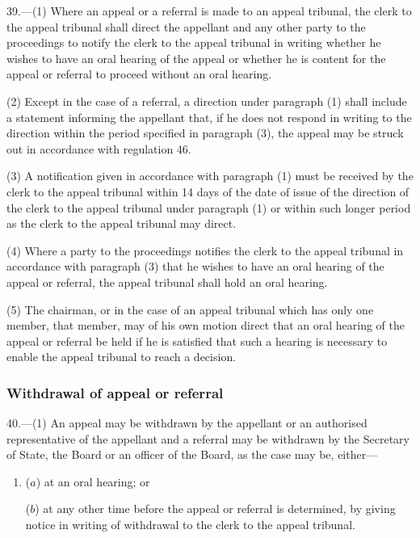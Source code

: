 \documentclass[12pt,a4paper]{article}
\begin{document}
39.—(1) Where an appeal or a referral is made to an appeal tribunal, the clerk to the appeal tribunal shall direct the appellant and any other party to the proceedings to notify the clerk to the appeal tribunal in writing whether he wishes to have an oral hearing of the appeal or whether he is content for the appeal or referral to proceed without an oral hearing.

(2) Except in the case of a referral, a direction under paragraph (1) shall include a statement informing the appellant that, if he does not respond in writing to the direction within the period specified in paragraph (3), the appeal may be struck out in accordance with regulation 46.

(3) A notification given in accordance with paragraph (1) must be received by the clerk to the appeal tribunal within 14 days of the date of issue of the direction of the clerk to the appeal tribunal under paragraph (1) or within such longer period as the clerk to the appeal tribunal may direct.

(4) Where a party to the proceedings notifies the clerk to the appeal tribunal in accordance with paragraph (3) that he wishes to have an oral hearing of the appeal or referral, the appeal tribunal shall hold an oral hearing.

(5) The chairman, or in the case of an appeal tribunal which has only one member, that member, may of his own motion direct that an oral hearing of the appeal or referral be held if he is satisfied that such a hearing is necessary to enable the appeal tribunal to reach a decision.

\subsubsection[40. Withdrawal of appeal or referral]{Withdrawal of appeal or referral}

40.—(1) An appeal may be withdrawn by the appellant or an authorised representative of the appellant and a referral may be withdrawn by the Secretary of State, 
the Board or an officer of the Board,   %
as the case may be, either—
\begin{enumerate}\item[]
($a$) at an oral hearing; or

($b$) at any other time before the appeal or referral is determined, by giving notice in writing of withdrawal to the clerk to the appeal tribunal.
\end{enumerate}
\end{document}
